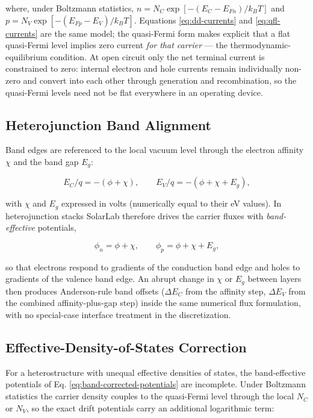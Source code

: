 \documentclass[
  11pt,
  american,
]{report}
\begin{document}
where, under Boltzmann statistics,
\(n = N_C \exp[-(E_C - E_{Fn})/k_BT]\) and
\(p = N_V \exp[-(E_{Fp} - E_V)/k_BT]\). Equations \ref{eq:dd-currents}
and \ref{eq:qfl-currents} are the same model; the quasi-Fermi form makes
explicit that a flat quasi-Fermi level implies zero current \emph{for
that carrier} --- the thermodynamic-equilibrium condition. At open
circuit only the net terminal current is constrained to zero: internal
electron and hole currents remain individually non-zero and convert into
each other through generation and recombination, so the quasi-Fermi
levels need not be flat everywhere in an operating device.

\hypertarget{heterojunction-band-alignment}{%
\subsection{Heterojunction Band
Alignment}\label{heterojunction-band-alignment}}

Band edges are referenced to the local vacuum level through the electron
affinity \(\chi\) and the band gap \(E_g\):

\[
E_C/q = -(\phi + \chi),
\qquad
E_V/q = -(\phi + \chi + E_g),
\]

with \(\chi\) and \(E_g\) expressed in volts (numerically equal to their
eV values). In heterojunction stacks SolarLab therefore drives the
carrier fluxes with \emph{band-effective} potentials,

\begin{equation}
\label{eq:band-corrected-potentials}
\phi_n=\phi+\chi, \qquad
\phi_p=\phi+\chi+E_g ,
\end{equation}

so that electrons respond to gradients of the conduction band edge and
holes to gradients of the valence band edge. An abrupt change in
\(\chi\) or \(E_g\) between layers then produces Anderson-rule band
offsets (\(\Delta E_C\) from the affinity step, \(\Delta E_V\) from the
combined affinity-plus-gap step) inside the same numerical flux
formulation, with no special-case interface treatment in the
discretization.

\hypertarget{effective-density-of-states-correction}{%
\subsection{Effective-Density-of-States
Correction}\label{effective-density-of-states-correction}}

For a heterostructure with unequal effective densities of states, the
band-effective potentials of Eq. \ref{eq:band-corrected-potentials} are
incomplete. Under Boltzmann statistics the carrier density couples to
the quasi-Fermi level through the local \(N_C\) or \(N_V\), so the exact
drift potentials carry an additional logarithmic term:
\end{document}
